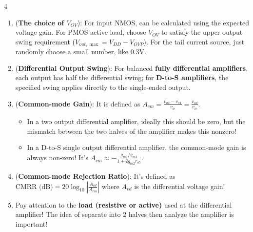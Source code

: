 \documentclass[10pt, landscape]{article}
\begin{document}
\begin{multicols}{4}
\begin{enumerate}
    \item (\textbf{The choice of $V_{OV}$}): For input NMOS, can be calculated using the expected voltage gain. For PMOS active load, choose $V_{OV}$ to satisfy the upper output swing requirement ($V_{out,\max}=V_{DD}-V_{OVP}$). For the tail current source, just randomly choose a small number, like 0.3V.
    \item (\textbf{Differential Output Swing}): For balanced \textbf{fully differential amplifiers}, each output has half the differential swing; for \textbf{D-to-S amplifiers}, the specified swing applies directly to the single-ended output.
    \item (\textbf{Common-mode Gain}): It is defined as $A_{cm}=\frac{v_{o2}-v_{o1}}{v_{ic}}=\frac{v_{od}}{v_{ic}}$.
    \begin{itemize}
        \item In a two output differential amplifier, ideally this should be zero, but the mismatch between the two halves of the amplifier makes this nonzero!
        \item In a D-to-S single output differential amplifier, the common-mode gain is always non-zero! It's $A_{cm}\approx-\frac{g_{m2}/g_{m3}}{1+2g_{m2}r_{o5}}$.
    \end{itemize}
    \item (\textbf{Common-mode Rejection Ratio}): It's defined as $\text{CMRR (dB)}=20\log_{10}\left|\frac{A_{vd}}{A_{cm}}\right|$ where $A_{vd}$ is the differential voltage gain!
    \item Pay attention to the \textbf{load (resistive or active)} used at the differential amplifier! The idea of separate into 2 halves then analyze the amplifier is important!
\end{enumerate}


\end{multicols}
\end{document}
